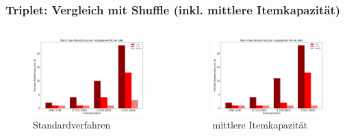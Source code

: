 \documentclass{beamer}
\begin{document}
\begin{frame}
\frametitle{Triplet: Vergleich mit Shuffle (inkl. mittlere Itemkapazität)}


\begin{columns}[c] %

\begin{figure}[!htbp]
\includegraphics[scale=0.2]{img/wc_trip.png}
\caption{Standardverfahren}
\label{fig:architecture}
\end{figure}


\begin{figure}[!htbp]
\includegraphics[scale=0.2]{img/shuffleWC.png}
\caption{mittlere Itemkapazität}
\label{fig:architecture}
\end{figure}


\end{columns}
\end{frame}
\end{document}
